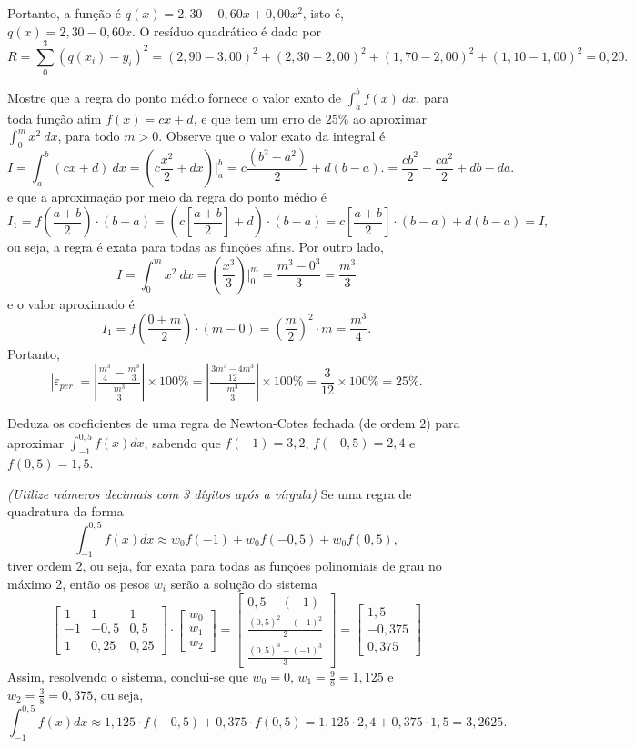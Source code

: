 \documentclass[12pt,a4paper]{article}
\begin{document}
\begin{ExerciseList}
Portanto, a função é $q(x) = 2,30 - 0,60x + 0,00x^2$, isto é, $q(x) = 2,30 - 0,60x$. O resíduo quadrático é dado por
\[
R = \sum_0^3 (q(x_i) - y_i)^2
  = (2,90 - 3,00)^2 + (2,30 - 2,00)^2 + (1,70 - 2,00)^2 + (1,10 - 1,00)^2 = 0,20.
\]



\Exercise[title={2,5}]
Mostre que a regra do ponto médio fornece o valor exato de $\int_a^b f(x)\ dx$, para toda função afim $f(x) = cx+d$, e que tem um erro de $25\%$ ao aproximar $\int_0^m x^2 \ dx$, para todo $m > 0$.
\Answer
Observe que o valor exato da integral é
\[
I
= \int_a^b (cx+d) \ dx
= \left(c\frac{x^2}{2}+dx\right)\big|_a^b
= c\frac{(b^2-a^2)}{2}+d(b-a).
= \frac{cb^2}{2}-\frac{ca^2}{2}+db-da.
\]
e que a aproximação por meio da regra do ponto médio é
\[
I_1
= f\left(\frac{a+b}{2}\right)\cdot (b-a)
= \left(c\left[\frac{a+b}{2}\right]+d\right)\cdot (b-a)
= c\left[\frac{a+b}{2}\right]\cdot (b-a)+d(b-a)
= I,
\]
ou seja, a regra é exata para todas as funções afins. Por outro lado,
\[
I
= \int_0^m x^2 \ dx
= \left(\frac{x^3}{3}\right)\big|_0^m
= \frac{m^3 - 0^3}{3}
= \frac{m^3}{3}
\]
e o valor aproximado é
\[
I_1
= f\left(\frac{0+m}{2}\right)\cdot (m-0)
= \left(\frac{m}{2}\right)^2 \cdot m
= \frac{m^3}{4}.
\]
Portanto,
\[
|\varepsilon_{per}|
= \left|\frac{\frac{m^3}{4} - \frac{m^3}{3}}{ \frac{m^3}{3} }\right|\times 100 \%
= \left|\frac{\frac{3m^3-4m^3}{12}}{ \frac{m^3}{3} }\right|\times 100 \%
= \frac{3}{12} \times 100 \%
= 25 \%.
\]


\Exercise[title={2,5}]
Deduza os coeficientes de uma regra de Newton-Cotes fechada (de ordem $2$) para aproximar $\int_{-1}^{0,5} f(x) dx$,
sabendo que
$f(-1) = 3,2$,
$f(-0,5) = 2,4$ e
$f( 0,5) = 1,5$.

{\color{blue} \textit{(Utilize números decimais com 3 dígitos após a vírgula)}}
\Answer Se uma regra de quadratura da forma
\[
\int_{-1}^{0,5} f(x) dx
\approx w_0 f(-1) + w_0 f(-0,5) + w_0 f(0,5),
\]
tiver ordem 2, ou seja, for exata para todas as funções polinomiais de grau no máximo 2, então os pesos $w_i$ serão a solução do sistema
\[
\begin{bmatrix}
 1 &  1   & 1 \\
-1 & -0,5 & 0,5 \\
 1 &  0,25 & 0,25
\end{bmatrix}
\cdot
\begin{bmatrix}
w_0\\
w_1\\
w_2
\end{bmatrix}
=
\begin{bmatrix}
0,5-(-1) \\
\frac{(0,5)^2 - (-1)^2}{2} \\
\frac{(0,5)^3 - (-1)^3}{3}
\end{bmatrix}
=
\begin{bmatrix}
1,5 \\
-0,375 \\
0,375
\end{bmatrix}
\]
Assim, resolvendo o sistema, conclui-se que $w_0 = 0$, $w_1 = \frac{9}{8} = 1,125$ e $w_2 = \frac{3}{8} = 0,375$, ou seja,
\[
\int_{-1}^{0,5} f(x) dx
\approx 1,125 \cdot f(-0,5) + 0,375 \cdot f(0,5)
= 1,125 \cdot 2,4 + 0,375 \cdot 1,5
= 3,2625.
\]


\end{ExerciseList}
\end{document}
